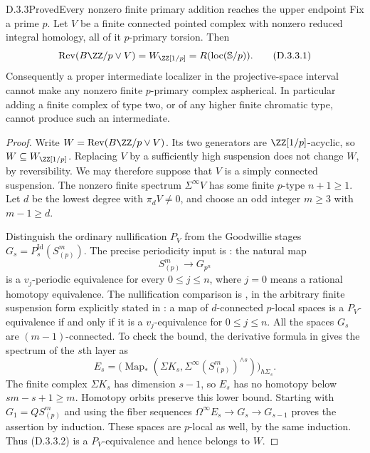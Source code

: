 \begin{claim}{D.3.3}{Proved}{Every nonzero finite primary addition reaches the upper endpoint}
Fix a prime $p$. Let $V$ be a finite connected pointed complex with
nonzero reduced integral homology, all of it $p$-primary torsion.
Then
\[
 \operatorname{Rev}(B\ZZ/p\vee V)
       =W_{\ZZ[1/p]}=R(\operatorname{loc}(\mathbb S/p)).
 \tag{D.3.3.1}
\]
Consequently a proper intermediate localizer in the projective-space
interval cannot make any nonzero finite $p$-primary complex aspherical.
In particular adding a finite complex of type two, or of any higher
finite chromatic type, cannot produce such an intermediate.
\end{claim}
\begin{proof}
Write $W=\operatorname{Rev}(B\ZZ/p\vee V)$. Its two generators
are $\ZZ[1/p]$-acyclic, so $W\subseteq W_{\ZZ[1/p]}$.
Replacing $V$ by a sufficiently high suspension does not change
$W$, by reversibility. We may therefore suppose that $V$ is a
simply connected suspension. The nonzero finite spectrum
$\Sigma^\infty V$ has some finite $p$-type $n+1\geq1$.
Let $d$ be the lowest degree with $\pi_dV\ne0$, and choose an
odd integer $m\geq3$ with $m-1\geq d$.

Distinguish the ordinary nullification $P_V$ from the Goodwillie
stages $G_s=P_s^{\mathrm{Id}}(S^m_{(p)})$.
The precise periodicity input is
\cite[Theorem~4.1]{EH5AroneMahowald1999}: the natural map
\[
                 S^m_{(p)}\longrightarrow G_{p^n}
 \tag{D.3.3.2}
\]
is a $v_j$-periodic equivalence for every $0\leq j\leq n$,
where $j=0$ means a rational homotopy equivalence.
The nullification comparison is
\cite[Corollary~4.8]{EH5Bousfield2001}, in the arbitrary finite
suspension form explicitly stated in
\cite[Theorem~3.1]{EH5BarthelHeutsMeier2021}: a map of
$d$-connected $p$-local spaces is a $P_V$-equivalence if and
only if it is a $v_j$-equivalence for $0\leq j\leq n$.
All the spaces $G_s$ are $(m-1)$-connected. To check the bound,
the derivative formula in
\cite[Theorem~2.1]{EH5AroneMahowald1999} gives the spectrum of
the $s$th layer as
\[
 E_s=\bigl(\operatorname{Map}_*(\Sigma K_s,
          \Sigma^\infty(S^m_{(p)})^{\wedge s})\bigr)_{h\Sigma_s}.
\]
The finite complex $\Sigma K_s$ has dimension $s-1$, so $E_s$
has no homotopy below $sm-s+1\geq m$. Homotopy orbits preserve
this lower bound. Starting with $G_1=QS^m_{(p)}$ and using
the fiber sequences $\Omega^\infty E_s\to G_s\to G_{s-1}$
proves the assertion by induction. These spaces are $p$-local
as well, by the same induction. Thus (D.3.3.2) is a
$P_V$-equivalence and hence belongs to $W$.


\end{proof}

